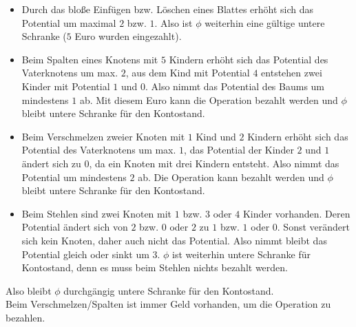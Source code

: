 \pagebreak

\begin{Beweis}
    \begin{itemize}
        \item
        Durch das bloße Einfügen bzw. Löschen eines Blattes erhöht sich
        das Potential um maximal $2$ bzw. $1$.
        Also ist $\phi$ weiterhin eine gültige untere Schranke
        ($5$ Euro wurden eingezahlt).

        \item
        Beim Spalten eines Knotens mit $5$ Kindern erhöht sich das
        Potential des Vaterknotens um max. $2$, aus dem Kind mit Potential
        $4$ entstehen zwei Kinder mit Potential $1$ und $0$.
        Also nimmt das Potential des Baums um mindestens $1$ ab.
        Mit diesem Euro kann die Operation bezahlt werden und $\phi$ bleibt
        untere Schranke für den Kontostand.

        \item
        Beim Verschmelzen zweier Knoten mit $1$ Kind und $2$ Kindern
        erhöht sich das Potential des Vaterknotens um max. $1$, das Potential
        der Kinder $2$ und $1$ ändert sich zu $0$, da ein Knoten mit
        drei Kindern entsteht.
        Also nimmt das Potential um mindestens $2$ ab.
        Die Operation kann bezahlt werden und $\phi$ bleibt
        untere Schranke für den Kontostand.

        \item
        Beim Stehlen sind zwei Knoten mit $1$ bzw. $3$ oder $4$ Kinder
        vorhanden.
        Deren Potential ändert sich von $2$ bzw. $0$ oder $2$ zu
        $1$ bzw. $1$ oder $0$.
        Sonst verändert sich kein Knoten, daher auch nicht das Potential.
        Also nimmt bleibt das Potential gleich oder sinkt um $3$.
        $\phi$ ist weiterhin untere Schranke für Kontostand, denn
        es muss beim Stehlen nichts bezahlt werden.
    \end{itemize}
    Also bleibt $\phi$ durchgängig untere Schranke für den Kontostand. \\
    Beim Verschmelzen/Spalten ist immer Geld vorhanden, um die Operation
    zu bezahlen.
\end{Beweis}

\pagebreak
